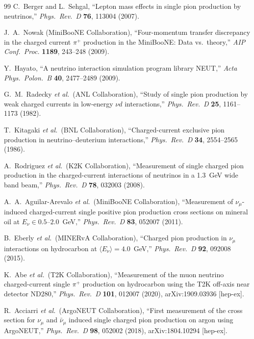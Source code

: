 \documentclass[11pt,a4paper]{article}
\begin{document}
\begin{thebibliography}{99}
  C.~Berger and L.~Sehgal,
  ``Lepton mass effects in single pion production by neutrinos,''
  \textit{Phys.\ Rev.\ D} \textbf{76}, 113004 (2007).

  J.~A.~Nowak (MiniBooNE Collaboration),
  ``Four-momentum transfer discrepancy in the charged current $\pi^+$ production
  in the MiniBooNE: Data vs.\ theory,''
  \textit{AIP Conf.\ Proc.} \textbf{1189}, 243--248 (2009).

  Y.~Hayato,
  ``A neutrino interaction simulation program library NEUT,''
  \textit{Acta Phys.\ Polon.\ B} \textbf{40}, 2477--2489 (2009).

  G.~M.~Radecky \textit{et al.}\ (ANL Collaboration),
  ``Study of single pion production by weak charged currents in low-energy
  $\nu d$ interactions,''
  \textit{Phys.\ Rev.\ D} \textbf{25}, 1161--1173 (1982).

  T.~Kitagaki \textit{et al.}\ (BNL Collaboration),
  ``Charged-current exclusive pion production in neutrino--deuterium
  interactions,''
  \textit{Phys.\ Rev.\ D} \textbf{34}, 2554--2565 (1986).

  A.~Rodriguez \textit{et al.}\ (K2K Collaboration),
  ``Measurement of single charged pion production in the charged-current
  interactions of neutrinos in a 1.3~GeV wide band beam,''
  \textit{Phys.\ Rev.\ D} \textbf{78}, 032003 (2008).

  A.~A.~Aguilar-Arevalo \textit{et al.}\ (MiniBooNE Collaboration),
  ``Measurement of $\nu_\mu$-induced charged-current single positive pion
  production cross sections on mineral oil at $E_\nu \in 0.5$--$2.0$~GeV,''
  \textit{Phys.\ Rev.\ D} \textbf{83}, 052007 (2011).

  B.~Eberly \textit{et al.}\ (MINERvA Collaboration),
  ``Charged pion production in $\nu_\mu$ interactions on hydrocarbon at
  $\langle E_\nu \rangle = 4.0$~GeV,''
  \textit{Phys.\ Rev.\ D} \textbf{92}, 092008 (2015).

  K.~Abe \textit{et al.}\ (T2K Collaboration),
  ``Measurement of the muon neutrino charged-current single $\pi^+$ production
  on hydrocarbon using the T2K off-axis near detector ND280,''
  \textit{Phys.\ Rev.\ D} \textbf{101}, 012007 (2020), arXiv:1909.03936 [hep-ex].

  R.~Acciarri \textit{et al.}\ (ArgoNEUT Collaboration),
  ``First measurement of the cross section for $\nu_\mu$ and $\bar{\nu}_\mu$
  induced single charged pion production on argon using ArgoNEUT,''
  \textit{Phys.\ Rev.\ D} \textbf{98}, 052002 (2018), arXiv:1804.10294 [hep-ex].


\end{thebibliography}
\end{document}
